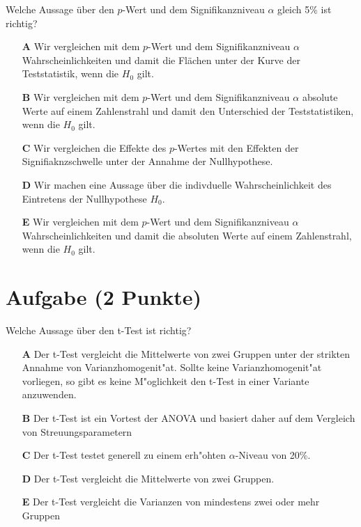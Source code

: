 \documentclass[a4paper, 10pt]{scrartcl}\usepackage[]{graphicx}\usepackage[]{xcolor}
\begin{document}
Welche Aussage über den $p$-Wert und dem Signifikanzniveau $\alpha$ gleich 5\% ist richtig?



\begin{enumerate}
\item [\textbf{A} \msquare] Wir vergleichen mit dem $p$-Wert und dem Signifikanzniveau $\alpha$ Wahrscheinlichkeiten und damit die Flächen unter der Kurve der Teststatistik, wenn die $H_0$ gilt.
\item [\textbf{B} \msquare] Wir vergleichen mit dem $p$-Wert und dem Signifikanzniveau $\alpha$ absolute Werte auf einem Zahlenstrahl und damit den Unterschied der Teststatistiken, wenn die $H_0$ gilt.
\item [\textbf{C} \msquare] Wir vergleichen die Effekte des $p$-Wertes mit den Effekten der Signifiaknzschwelle unter der Annahme der Nullhypothese.
\item [\textbf{D} \msquare] Wir machen eine Aussage über die indivduelle Wahrscheinlichkeit des Eintretens der Nullhypothese $H_0$.
\item [\textbf{E} \msquare] Wir vergleichen mit dem $p$-Wert und dem Signifikanzniveau $\alpha$ Wahrscheinlichkeiten und damit die absoluten Werte auf einem Zahlenstrahl, wenn die $H_0$ gilt.
\end{enumerate}

\section{Aufgabe \hfill (2 Punkte)}

Welche Aussage {\"u}ber den t-Test ist richtig?



\begin{enumerate}
\item [\textbf{A} \msquare] Der t-Test vergleicht die Mittelwerte von zwei Gruppen unter der strikten Annahme von Varianzhomogenit{"a}t. Sollte keine Varianzhomogenit{"a}t vorliegen, so gibt es keine M{"o}glichkeit den t-Test in einer Variante anzuwenden.
\item [\textbf{B} \msquare] Der t-Test ist ein Vortest der ANOVA und basiert daher auf dem Vergleich von Streuungsparametern
\item [\textbf{C} \msquare] Der t-Test testet generell zu einem erh{"o}hten $\alpha$-Niveau von 20\%.
\item [\textbf{D} \msquare] Der t-Test vergleicht die Mittelwerte von zwei Gruppen.
\item [\textbf{E} \msquare] Der t-Test vergleicht die Varianzen von mindestens zwei oder mehr Gruppen
\end{enumerate}    
\end{document}
